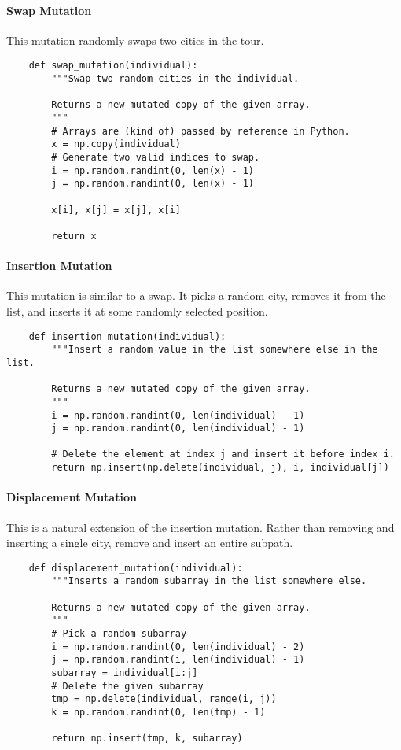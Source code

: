 \documentclass{article}
\begin{document}
\paragraph{Swap Mutation} This mutation randomly swaps two cities in the tour.
\begin{verbatim}
    def swap_mutation(individual):
        """Swap two random cities in the individual.

        Returns a new mutated copy of the given array.
        """
        # Arrays are (kind of) passed by reference in Python.
        x = np.copy(individual)
        # Generate two valid indices to swap.
        i = np.random.randint(0, len(x) - 1)
        j = np.random.randint(0, len(x) - 1)

        x[i], x[j] = x[j], x[i]

        return x
\end{verbatim}

\paragraph{Insertion Mutation} This mutation is similar to a swap. It picks a random city, removes
it from the list, and inserts it at some randomly selected position.
\begin{verbatim}
    def insertion_mutation(individual):
        """Insert a random value in the list somewhere else in the list.

        Returns a new mutated copy of the given array.
        """
        i = np.random.randint(0, len(individual) - 1)
        j = np.random.randint(0, len(individual) - 1)

        # Delete the element at index j and insert it before index i.
        return np.insert(np.delete(individual, j), i, individual[j])
\end{verbatim}

\paragraph{Displacement Mutation} This is a natural extension of the insertion mutation. Rather
than removing and inserting a single city, remove and insert an entire subpath.
\begin{verbatim}
    def displacement_mutation(individual):
        """Inserts a random subarray in the list somewhere else.

        Returns a new mutated copy of the given array.
        """
        # Pick a random subarray
        i = np.random.randint(0, len(individual) - 2)
        j = np.random.randint(i, len(individual) - 1)
        subarray = individual[i:j]
        # Delete the given subarray
        tmp = np.delete(individual, range(i, j))
        k = np.random.randint(0, len(tmp) - 1)

        return np.insert(tmp, k, subarray)
\end{verbatim}
\end{document}
